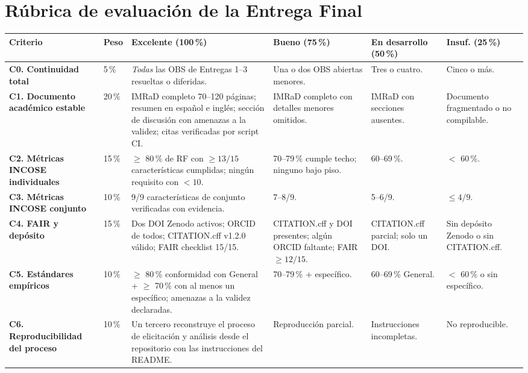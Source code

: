 \documentclass[11pt,a4paper]{article}
\begin{document}
\section{R\'ubrica de evaluaci\'on de la Entrega Final}

\begin{longtable}{|L{4.2cm}|C{0.9cm}|L{3.3cm}|L{2.4cm}|L{2.4cm}|L{1.6cm}|}
\hline
{}
\textbf{Criterio} & \textbf{Peso} & \textbf{Excelente (100\,\%)} & \textbf{Bueno (75\,\%)} & \textbf{En desarrollo (50\,\%)} & \textbf{Insuf. (25\,\%)}\\ \hline
\endhead

\textbf{C0. Continuidad total} & 5\,\% & \emph{Todas} las OBS de Entregas 1--3 resueltas o diferidas. & Una o dos OBS abiertas menores. & Tres o cuatro. & Cinco o m\'as.\\ \hline
{}
\textbf{C1. Documento acad\'emico estable} & 20\,\% & IMRaD completo 70--120 p\'aginas; resumen en espa\~nol e ingl\'es; secci\'on de discusi\'on con amenazas a la validez; citas verificadas por script CI. & IMRaD completo con detalles menores omitidos. & IMRaD con secciones ausentes. & Documento fragmentado o no compilable.\\ \hline
\textbf{C2. M\'etricas INCOSE individuales} & 15\,\% & $\geq$ 80\,\% de RF con $\geq 13/15$ caracter\'isticas cumplidas; ning\'un requisito con $< 10$. & 70--79\,\% cumple techo; ninguno bajo piso. & 60--69\,\%. & $<$ 60\,\%.\\ \hline
{}
\textbf{C3. M\'etricas INCOSE conjunto} & 10\,\% & 9/9 caracter\'isticas de conjunto verificadas con evidencia. & 7--8/9. & 5--6/9. & $\leq 4/9$.\\ \hline
\textbf{C4. FAIR y dep\'osito} & 15\,\% & Dos DOI Zenodo activos; ORCID de todos; CITATION.cff v1.2.0 v\'alido; FAIR checklist 15/15. & CITATION.cff y DOI presentes; alg\'un ORCID faltante; FAIR $\geq 12/15$. & CITATION.cff parcial; solo un DOI. & Sin dep\'osito Zenodo o sin CITATION.cff.\\ \hline
{}
\textbf{C5. Est\'andares emp\'iricos} & 10\,\% & $\geq$ 80\,\% conformidad con General + $\geq$ 70\,\% con al menos un espec\'ifico; amenazas a la validez declaradas. & 70--79\,\% + espec\'ifico. & 60--69\,\% General. & $<$ 60\,\% o sin espec\'ifico.\\ \hline
\textbf{C6. Reproducibilidad del proceso} & 10\,\% & Un tercero reconstruye el proceso de elicitaci\'on y an\'alisis desde el repositorio con las instrucciones del README. & Reproducci\'on parcial. & Instrucciones incompletas. & No reproducible.\\ \hline

\end{longtable}
\end{document}
